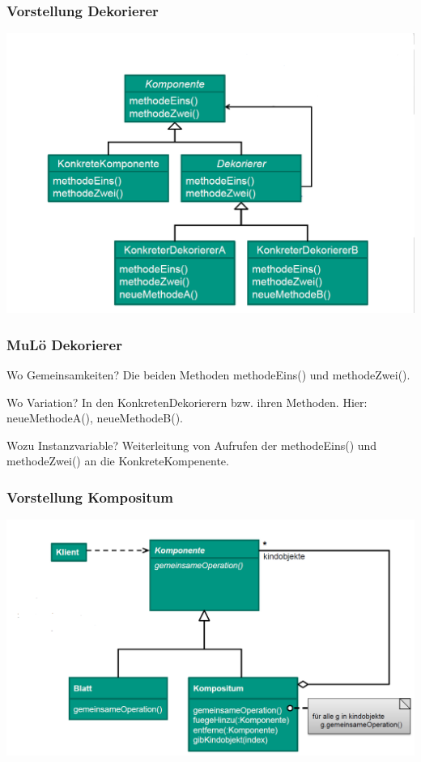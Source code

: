 \documentclass[18pt]{beamer}
\begin{document}
	\begin{frame}
		\frametitle{Vorstellung Dekorierer}
		\includegraphics[scale=0.35]{./pics/tut4/decor.png}
	\end{frame}

	\begin{frame}
		\frametitle{MuLö Dekorierer}
		\begin{block}{Wo Gemeinsamkeiten?}
			Die beiden Methoden methodeEins() und methodeZwei().
		\end{block}
		\begin{block}{Wo Variation?}
			In den KonkretenDekorierern bzw. ihren Methoden. Hier: neueMethodeA(), neueMethodeB().
		\end{block}
		\begin{block}{Wozu Instanzvariable?}
			Weiterleitung von Aufrufen der methodeEins() und methodeZwei() an die KonkreteKompenente.
		\end{block}
	\end{frame}

	\begin{frame}
		\frametitle{Vorstellung Kompositum}
		\includegraphics[scale=0.35]{./pics/tut4/comp.png}
	\end{frame}
\end{document}
